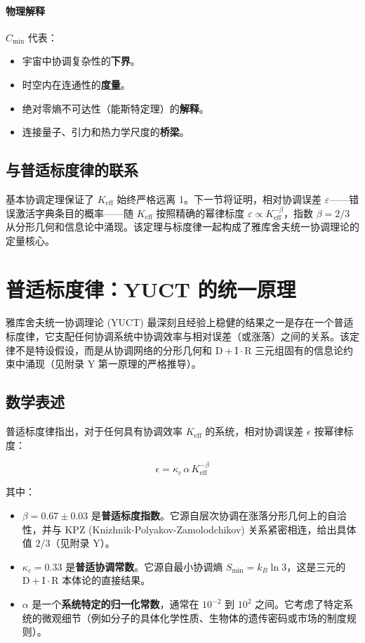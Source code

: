 \documentclass[11pt,a4paper]{article}
\begin{document}
	\paragraph{物理解释}
	\(C_{\min}\) 代表：
	\begin{itemize}
		\item 宇宙中协调复杂性的\textbf{下界}。
		\item 时空内在连通性的\textbf{度量}。
		\item 绝对零熵不可达性（能斯特定理）的\textbf{解释}。
		\item 连接量子、引力和热力学尺度的\textbf{桥梁}。
	\end{itemize}
	
	\subsection{与普适标度律的联系}
	
	基本协调定理保证了 \(K_{\mathrm{eff}}\) 始终严格远离 1。下一节将证明，相对协调误差 \(\varepsilon\)——错误激活字典条目的概率——随 \(K_{\mathrm{eff}}\) 按照精确的幂律标度 \(\varepsilon \propto K_{\mathrm{eff}}^{-\beta}\)，指数 \(\beta = 2/3\) 从分形几何和信息论中涌现。该定理与标度律一起构成了雅库舍夫统一协调理论的定量核心。
	
	\section{普适标度律：YUCT 的统一原理}
	\label{sec:universal_scaling}
	
	雅库舍夫统一协调理论 (YUCT) 最深刻且经验上稳健的结果之一是存在一个普适标度律，它支配任何协调系统中协调效率与相对误差（或涨落）之间的关系。该定律不是特设假设，而是从协调网络的分形几何和 \(\mathrm{D} + \mathrm{I}\cdot \mathrm{R}\) 三元组固有的信息论约束中涌现（见附录 Y 第一原理的严格推导）。
	
	\subsection{数学表述}
	
	普适标度律指出，对于任何具有协调效率 \(K_{\mathrm{eff}}\) 的系统，相对协调误差 \(\epsilon\) 按幂律标度：
	
	\begin{equation}
		\boxed{\epsilon = \kappa_c \, \alpha \, K_{\mathrm{eff}}^{-\beta}}
		\label{eq:universal_scaling}
	\end{equation}
	
	其中：
	\begin{itemize}
		\item \(\beta = 0.67 \pm 0.03\) 是\textbf{普适标度指数}。它源自层次协调在涨落分形几何上的自洽性，并与 KPZ (Knizhnik-Polyakov-Zamolodchikov) 关系紧密相连，给出具体值 \(2/3\)（见附录 Y）。
		\item \(\kappa_c = 0.33\) 是\textbf{普适协调常数}。它源自最小协调熵 \(S_{\mathrm{min}} = k_B \ln 3\)，这是三元的 \(\mathrm{D}+\mathrm{I}\cdot\mathrm{R}\) 本体论的直接结果。
		\item \(\alpha\) 是一个\textbf{系统特定的归一化常数}，通常在 \(10^{-2}\) 到 \(10^2\) 之间。它考虑了特定系统的微观细节（例如分子的具体化学性质、生物体的遗传密码或市场的制度规则）。
	\end{itemize}
	
\end{document}
